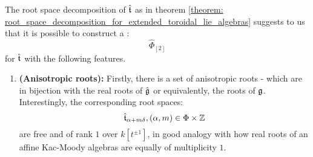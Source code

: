        \begin{remark} \label{remark: toroidal_root_systems}
            The root space decomposition of $\hat{\mathfrak{t}}$ as in theorem \ref{theorem: root_space_decomposition_for_extended_toroidal_lie_algebras} suggests to us that it is possible to construct a :
                $$\hat{\Phi}_{[2]}$$
            for $\hat{\mathfrak{t}}$ with the following features.
            \begin{enumerate}
                \item \textbf{(Anisotropic roots):} Firstly, there is a set of anisotropic roots - which are in bijection with the real roots of $\hat{\mathfrak{g}}$ or equivalently, the roots of $\mathfrak{g}$. Interestingly, the corresponding root spaces:
                    $$\extendedtoroidal_{\alpha + m\delta}, (\alpha, m) \in \Phi \x \Z$$
                are free and of rank $1$ over $k[t^{\pm 1}]$, in good analogy with how real roots of an affine Kac-Moody algebras are equally of multiplicity $1$.


\end{enumerate}
\end{remark}
